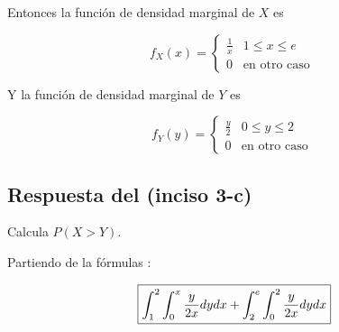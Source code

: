\documentclass[12pt]{article}
\begin{document}
    \begin{flushleft}
        Entonces la funci\'on de densidad marginal de $X$ es     
    \end{flushleft}

    \begin{equation*}
        f_X\left(x\right) = \begin{cases} 
            \frac{1}{x} & 1\leq x \leq e  
            \\
            0  & \mbox{en otro caso }
            \end{cases}
    \end{equation*}

    \begin{flushleft}
        Y la funci\'on de densidad marginal de $Y$ es     
    \end{flushleft}

    \begin{equation*}
        f_Y\left(y\right) = \begin{cases} 
            \frac{y}{2} & 0 \leq y \leq 2  
            \\
            0  & \mbox{en otro caso }
            \end{cases}
    \end{equation*}

    \subsection*{Respuesta del (inciso 3-c)} 

    \begin{flushleft}
        Calcula $P(X >Y)$.
    \end{flushleft}
    
    \begin{flushleft}
        Partiendo de la f\'ormulas :
    \end{flushleft}

    \begin{equation*}
        \fbox{$
            \displaystyle\int_{1}^{2}\int_{0}^{x}\frac{y}{2x}dy dx  + \int_{2}^{e}\int_{0}^{2}\frac{y}{2x}dy dx 
        $}
    \end{equation*}
     
\end{document}
